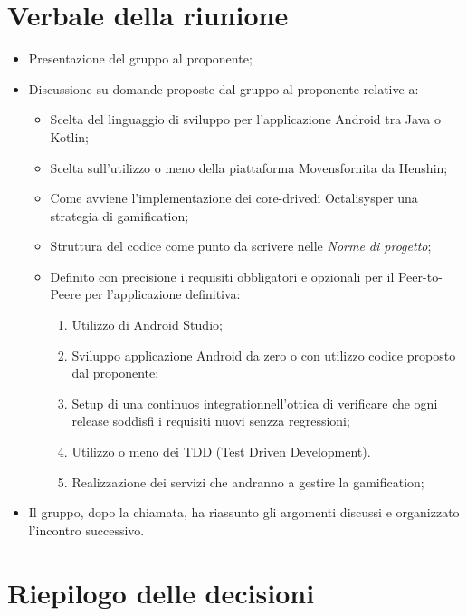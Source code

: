 \section{Verbale della riunione}
\begin{itemize}
	\item Presentazione del gruppo al proponente;
	\item Discussione su domande proposte dal gruppo al proponente relative a:
		\begin{itemize}
			\item Scelta del linguaggio di sviluppo per l'applicazione Android tra Java o Kotlin\glo;
			\item Scelta sull'utilizzo o meno della piattaforma Movens\glosp fornita da Henshin\glo;
			\item Come avviene l'implementazione dei core-drive\glosp di Octalisys\glosp per una strategia di gamification\glo;
			\item Struttura del codice come punto da scrivere nelle \textit{Norme di progetto};
			\item Definito con precisione i requisiti obbligatori e opzionali per il Peer-to-Peer\glosp e per l'applicazione definitiva:
				\begin{enumerate}
					\item Utilizzo di Android Studio;
					\item Sviluppo applicazione Android da zero o con utilizzo codice proposto dal proponente;
					\item Setup di una continuos integration\glosp nell'ottica di verificare che ogni release soddisfi i requisiti nuovi senzza regressioni;
					\item Utilizzo o meno dei TDD (Test Driven Development).
					\item Realizzazione dei servizi che andranno a gestire la gamification; 
				\end{enumerate}
		\end{itemize}
	\item Il gruppo, dopo la chiamata, ha riassunto gli argomenti discussi e organizzato l'incontro successivo.
\end{itemize} 
\pagebreak
\section{Riepilogo delle decisioni}

	
